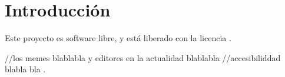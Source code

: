 \chapter{Introducción}

Este proyecto es software libre, y está liberado con la licencia \cite{gplv3}.

//los memes blablabla y editores en la actualidad blablabla
//accesibiliddad blabla bla .


